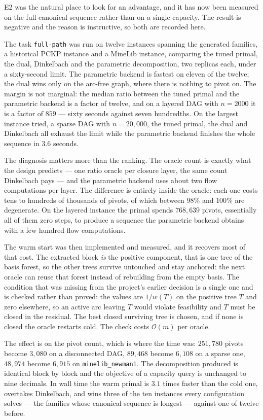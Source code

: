 E2 was the natural place to look for an advantage, and it has now been measured
on the full canonical sequence rather than on a single capacity. The result is
negative and the reason is instructive, so both are recorded here.

The task \texttt{full-path} was run on twelve instances spanning the generated
families, a historical PCKP instance and a MineLib instance, comparing the tuned
primal, the dual, Dinkelbach and the parametric decomposition, two replicas
each, under a sixty-second limit. The parametric backend is fastest on eleven of
the twelve; the dual wins only on the arc-free graph, where there is nothing to
pivot on. The margin is not marginal: the median ratio between the tuned primal
and the parametric backend is a factor of twelve, and on a layered DAG with $n =
2000$ it is a factor of $859$ --- sixty seconds against seven hundredths. On the
largest instance tried, a sparse DAG with $n = 20{,}000$, the tuned primal, the
dual and Dinkelbach all exhaust the limit while the parametric backend finishes
the whole sequence in $3.6$ seconds.

The diagnosis matters more than the ranking. The oracle count is exactly what
the design predicts --- one ratio oracle per closure layer, the same count
Dinkelbach pays --- and the parametric backend uses about two flow computations
per layer. The difference is entirely inside the oracle: each one costs tens to
hundreds of thousands of pivots, of which between $98\%$ and $100\%$ are
degenerate. On the layered instance the primal spends $768{,}639$ pivots, essentially
all of them zero steps, to produce a sequence the parametric backend obtains
with a few hundred flow computations.

The warm start was then implemented and measured, and it recovers most of that
cost. The extracted block \emph{is} the positive component, that is one tree of
the basis forest, so the other trees survive untouched and stay anchored: the
next oracle can reuse that forest instead of rebuilding from the empty basis.
The condition that was missing from the project's earlier decision is a single
one and is checked rather than proved: the values are $1/w(T)$ on the positive
tree $T$ and zero elsewhere, so an active arc leaving $T$ would violate
feasibility and $T$ must be closed in the residual. The best closed surviving
tree is chosen, and if none is closed the oracle restarts cold. The check costs
$\mathcal{O}(m)$ per oracle.

The effect is on the pivot count, which is where the time was: $251{,}780$
pivots become $3{,}080$ on a disconnected DAG, $89{,}468$ become $6{,}108$ on a
sparse one, $48{,}974$ become $6{,}915$ on \texttt{minelib\_newman1}. The
decomposition produced is identical block by block and the objective of a
capacity query is unchanged to nine decimals. In wall time the warm primal is
$3.1$ times faster than the cold one, overtakes Dinkelbach, and wins three of
the ten instances every configuration solves --- the families whose canonical
sequence is longest --- against one of twelve before.

